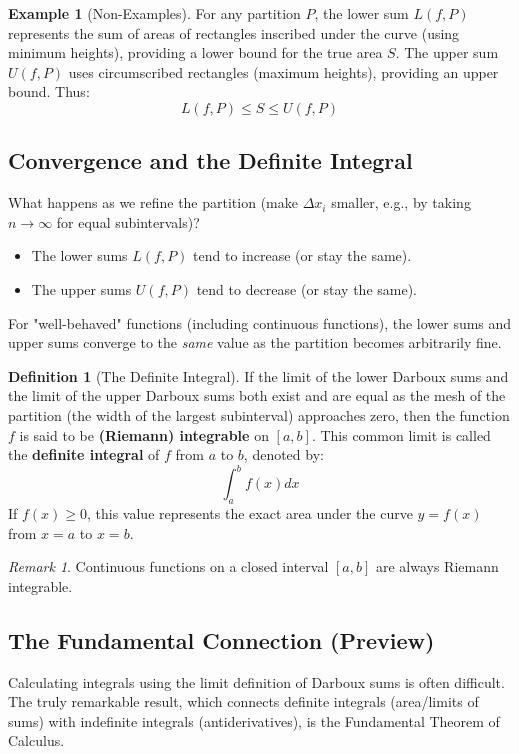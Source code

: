 \documentclass[11pt]{article}
\theoremstyle{plain}
\theoremstyle{definition}
\newtheorem{definition}[theorem]{Definition}
\newtheorem{example}[theorem]{Example}
\theoremstyle{remark}
\newtheorem{remark}[theorem]{Remark}
\begin{document}
\begin{example}[Non-Examples]
For any partition $P$, the lower sum $L(f,P)$ represents the sum of areas of rectangles inscribed under the curve (using minimum heights), providing a lower bound for the true area $S$. The upper sum $U(f,P)$ uses circumscribed rectangles (maximum heights), providing an upper bound. Thus:
\[ L(f, P) \le S \le U(f, P) \]

\subsection{Convergence and the Definite Integral}

What happens as we refine the partition (make $\Delta x_i$ smaller, e.g., by taking $n \to \infty$ for equal subintervals)?
\begin{itemize}
    \item The lower sums $L(f,P)$ tend to increase (or stay the same).
    \item The upper sums $U(f,P)$ tend to decrease (or stay the same).
\end{itemize}
For "well-behaved" functions (including continuous functions), the lower sums and upper sums converge to the \emph{same} value as the partition becomes arbitrarily fine.

\begin{definition}[The Definite Integral]
If the limit of the lower Darboux sums and the limit of the upper Darboux sums both exist and are equal as the mesh of the partition (the width of the largest subinterval) approaches zero, then the function $f$ is said to be \textbf{(Riemann) integrable} on $[a,b]$. This common limit is called the \textbf{definite integral} of $f$ from $a$ to $b$, denoted by:
\[ \int_a^b f(x) dx \]
If $f(x) \ge 0$, this value represents the exact area under the curve $y=f(x)$ from $x=a$ to $x=b$.
\end{definition}

\begin{remark}
Continuous functions on a closed interval $[a,b]$ are always Riemann integrable.
\end{remark}

\subsection{The Fundamental Connection (Preview)}

Calculating integrals using the limit definition of Darboux sums is often difficult. The truly remarkable result, which connects definite integrals (area/limits of sums) with indefinite integrals (antiderivatives), is the Fundamental Theorem of Calculus.


\end{example}
\end{document}
